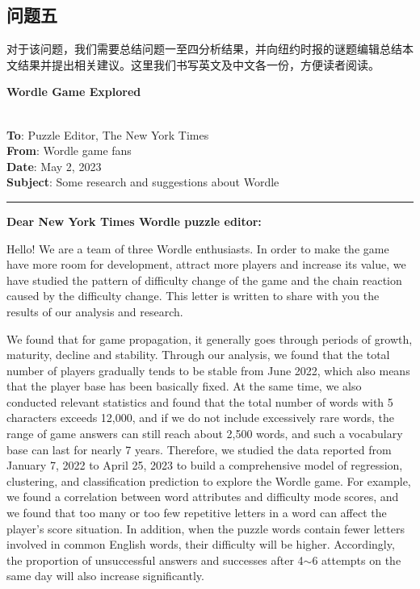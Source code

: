 \documentclass{MathModeling}
\begin{document}
	\subsection{问题五}
	对于该问题，我们需要总结问题一至四分析结果，并向纽约时报的谜题编辑总结本文结果并提出相关建议。这里我们书写英文及中文各一份，方便读者阅读。
	\newpage
	\centerline{{\Large \textbf{Wordle Game Explored}}}\label{问题五}
	~\\
	\noindent \textbf{To}: Puzzle Editor, The New York Times\\
	\noindent \textbf{From}: Wordle game fans\\
	\noindent \textbf{Date}: May 2, 2023\\
	\noindent \textbf{Subject}: Some research and suggestions about Wordle\\
	\noindent\rule{\textwidth}{1.2pt}
	\textbf{Dear New York Times Wordle puzzle editor:}

	Hello! We are a team of three Wordle enthusiasts. In order to make the game have more room for development, attract more players and increase its value, we have studied the pattern of difficulty change of the game and the chain reaction caused by the difficulty change. This letter is written to share with you the results of our analysis and research.

	We found that for game propagation, it generally goes through periods of growth, maturity, decline and stability. Through our analysis, we found that the total number of players gradually tends to be stable from June 2022, which also means that the player base has been basically fixed. At the same time, we also conducted relevant statistics and found that the total number of words with 5 characters exceeds 12,000, and if we do not include excessively rare words, the range of game answers can still reach about 2,500 words, and such a vocabulary base can last for nearly 7 years. Therefore, we studied the data reported from January 7, 2022 to April 25, 2023 to build a comprehensive model of regression, clustering, and classification prediction to explore the Wordle game. For example, we found a correlation between word attributes and difficulty mode scores, and we found that too many or too few repetitive letters in a word can affect the player's score situation. In addition, when the puzzle words contain fewer letters involved in common English words, their difficulty will be higher. Accordingly, the proportion of unsuccessful answers and successes after 4$\sim$6 attempts on the same day will also increase significantly.
\end{document}
